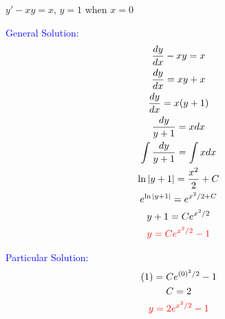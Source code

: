 \item $y'-xy=x$, $y=1$ when $x=0$

\textcolor{blue}{
    \begin{minipage}[t]{0.45\textwidth}
        General Solution:
        \begin{gather*}
        \frac{dy}{dx}-xy=x\\
        \frac{dy}{dx}=xy+x\\
        \frac{dy}{dx}=x(y+1)\\
        \frac{dy}{y+1}=xdx\\
        \int\frac{dy}{y+1}=\int xdx\\
        \ln|y+1|=\frac{x^2}{2}+C\\
        e^{\ln|y+1|}=e^{x^2/2+C}\\
        y+1=Ce^{x^2/2}\\
        \textcolor{red}{
            y=Ce^{x^2/2}-1
        }
        \end{gather*}
    \end{minipage}
    \hfill
    \begin{minipage}[t]{0.45\textwidth}
        Particular Solution:
        \begin{gather*}
        (1)=Ce^{(0)^2/2}-1\\
        C=2\\
        \textcolor{red}{
            y=2e^{x^2/2}-1
        }
        \end{gather*}
    \end{minipage}
}